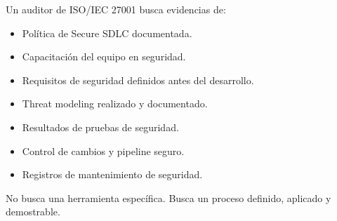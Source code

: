 Un auditor de ISO/IEC 27001 busca evidencias de:

\begin{itemize}
    \item Política de Secure SDLC documentada.
    \item Capacitación del equipo en seguridad.
    \item Requisitos de seguridad definidos antes del desarrollo.
    \item Threat modeling realizado y documentado.
    \item Resultados de pruebas de seguridad.
    \item Control de cambios y pipeline seguro.
    \item Registros de mantenimiento de seguridad.
\end{itemize}

No busca una herramienta específica. Busca un proceso definido, aplicado y demostrable.
